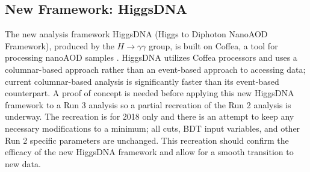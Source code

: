 \documentclass[12pt]{article}
\begin{document}

\subsection{New Framework: HiggsDNA}
The new analysis framework HiggsDNA (Higgs to Diphoton NanoAOD Framework), produced by the $H \rightarrow \gamma\gamma$ group, is built on Coffea, a tool for processing nanoAOD samples \cite{lindsey_gray_2023_8408347}. HiggsDNA utilizes Coffea processors and uses a columnar-based approach rather than an event-based approach to accessing data; current columnar-based analysis is significantly faster than its event-based counterpart.
A proof of concept is needed before applying this new HiggsDNA framework to a Run 3 analysis so a partial recreation of the Run 2 analysis is underway. The recreation is for 2018 only and there is an attempt to keep any necessary modifications to a minimum; all cuts, BDT input variables, and other Run 2 specific parameters are unchanged. This recreation should confirm the efficacy of the new HiggsDNA framework and allow for a smooth transition to new data.\par
\end{document}
